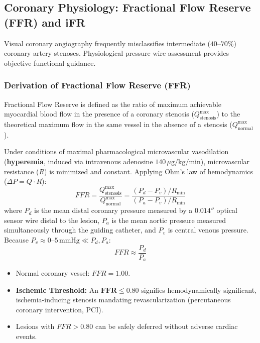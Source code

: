 \documentclass[11pt,a4paper]{article}
\begin{document}
\subsection{Coronary Physiology: Fractional Flow Reserve (FFR) and iFR}

Visual coronary angiography frequently misclassifies intermediate ($40\text{--}70\%$) coronary artery stenoses. Physiological pressure wire assessment provides objective functional guidance.

\subsubsection{Derivation of Fractional Flow Reserve (FFR)}
Fractional Flow Reserve is defined as the ratio of maximum achievable myocardial blood flow in the presence of a coronary stenosis ($Q_{\text{stenosis}}^{\text{max}}$) to the theoretical maximum flow in the same vessel in the absence of a stenosis ($Q_{\text{normal}}^{\text{max}}$).

Under conditions of maximal pharmacological microvascular vasodilation (\textbf{hyperemia}, induced via intravenous adenosine $140\,\mu\text{g/kg/min}$), microvascular resistance ($R$) is minimized and constant. Applying Ohm's law of hemodynamics ($\Delta P = Q \cdot R$):
\begin{equation}
    FFR = \frac{Q_{\text{stenosis}}^{\text{max}}}{Q_{\text{normal}}^{\text{max}}} = \frac{(P_d - P_v) / R_{\text{min}}}{(P_a - P_v) / R_{\text{min}}}
\end{equation}
where $P_d$ is the mean distal coronary pressure measured by a $0.014''$ optical sensor wire distal to the lesion, $P_a$ is the mean aortic pressure measured simultaneously through the guiding catheter, and $P_v$ is central venous pressure. Because $P_v \approx 0\text{--}5\,\text{mmHg} \ll P_d, P_a$:
\begin{equation}
    FFR \approx \frac{P_d}{P_a}
\end{equation}
\begin{itemize}[leftmargin=*]
    \item Normal coronary vessel: $FFR = 1.00$.
    \item \textbf{Ischemic Threshold:} An $\mathbf{FFR \le 0.80}$ signifies hemodynamically significant, ischemia-inducing stenosis mandating revascularization (percutaneous coronary intervention, PCI).
    \item Lesions with $FFR > 0.80$ can be safely deferred without adverse cardiac events.
\end{itemize}
\end{document}

